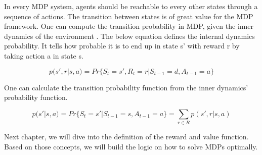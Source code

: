 In every MDP system, agents should be reachable to every other states through a sequence of actions. The transition between states is of great value for the MDP framework.
One can compute the transition probability in MDP, given the inner dynamics of the environment \cite{Sutton2018}. The below equation defines the internal dynamics probability. It tells how probable it is to end up in state s’ with reward r by taking action a in state s. 

\begin{equation}
    p(s',r | s,a) = Pr\{S_t = s', R_t = r | S_{t-1} = d, A_{t-1} = a\}
\end{equation}

One can calculate the transition probability function from the inner dynamics’ probability function.

\begin{equation}
    p(s'|s,a) = Pr\{S_t=s'| S_{t-1}=s, A_{t-1}=a\} = \sum_{r \in R}p(s',r|s,a)
\end{equation}

Next chapter, we will dive into the definition of the reward and value function. Based on those concepts, we will build the logic on how to solve MDPs optimally.